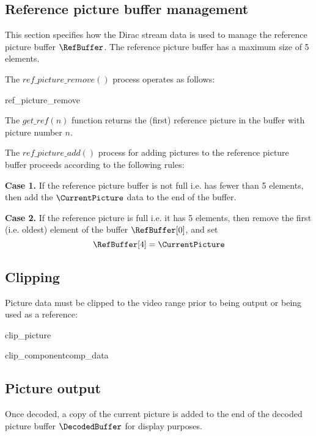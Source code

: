 \subsection{Reference picture buffer management}
\label{refbuffer}

This section specifies how the Dirac stream data is used to manage the reference 
picture buffer $\RefBuffer$. The reference picture buffer has a maximum size of
5 elements.

The $ref\_picture\_remove()$ process operates as
follows:

\begin{pseudo}{ref\_picture\_remove}{}
        \bsEND
    \bsEND
\bsEND
\bsCODE{\RetiredPictureList=\emptyset}
\end{pseudo}

The $get\_ref(n)$ function returns the (first) reference picture in the buffer with 
picture number $n$.  

The $ref\_picture\_add()$ process for adding pictures to the reference picture
buffer proceeds according to the following rules:

{\bf Case 1.} If the reference picture buffer is not full i.e. has fewer than 5 elements,
then add the $\CurrentPicture$ data to the end of the buffer. 

{\bf Case 2.} If the reference picture is full i.e. it has 5 elements, then remove the
first (i.e. oldest) element of the buffer $\RefBuffer[0]$, and set
\[\RefBuffer[4]=\CurrentPicture\]
 
\subsection{Clipping}
\label{pictureclip}

Picture data must be clipped to the video range prior to being output or being
used as a reference:

\begin{pseudo}{clip\_picture}{}
\bsEND
\end{pseudo}

\begin{pseudo}{clip\_component}{comp\_data}
     \bsEND
\bsEND
\end{pseudo}

\subsection{Picture output}
\label{picoutput}

Once decoded, a copy of the current picture is added to the end of the decoded picture buffer
$\DecodedBuffer$ for display purposes.
